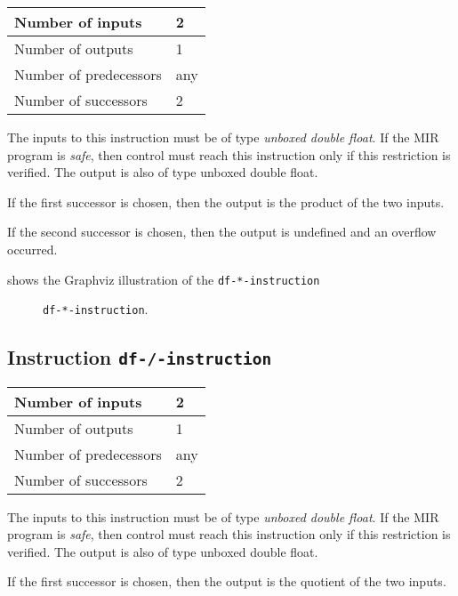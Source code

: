 \begin{tabular}{|l|l|}
\hline
Number of inputs & 2\\
\hline
Number of outputs & 1\\
\hline
Number of predecessors & any\\
\hline
Number of successors & 2\\
\hline
\end{tabular}

The inputs to this instruction must be of type \emph{unboxed double
  float}.  If the MIR program is \emph{safe}, then control must reach
this instruction only if this restriction is verified.  The output is
also of type unboxed double float.

If the first successor is chosen, then the output is
the product of the two inputs.  

If the second successor is chosen, then the output is undefined and an
overflow occurred. 

 shows the Graphviz illustration of the
\texttt{df-*-instruction}

\begin{figure}
\begin{center}
\end{center}
\caption{\label{fig-df-*-instruction}
\texttt{df-*-instruction}.}
\end{figure}

\subsection{Instruction \texttt{df-/-instruction}}
\label{mir-instruction-df-/}

\begin{tabular}{|l|l|}
\hline
Number of inputs & 2\\
\hline
Number of outputs & 1\\
\hline
Number of predecessors & any\\
\hline
Number of successors & 2\\
\hline
\end{tabular}

The inputs to this instruction must be of type \emph{unboxed double
  float}.  If the MIR program is \emph{safe}, then control must reach
this instruction only if this restriction is verified.  The output is
also of type unboxed double float.

If the first successor is chosen, then the output is
the quotient of the two inputs.  

